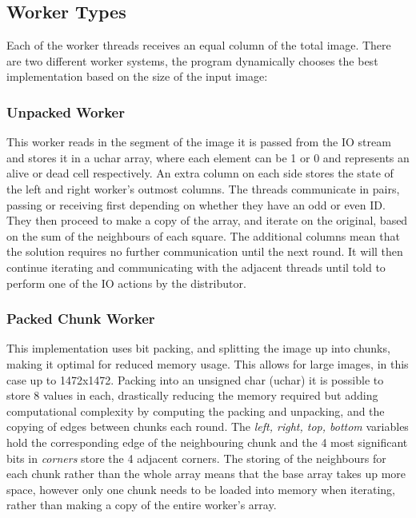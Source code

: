 \documentclass[11pt, oneside]{article}
\begin{document}
\subsection{Worker Types}
\vspace{-2mm}
Each of the worker threads receives an equal column of the total image. There are two different worker systems, the program dynamically chooses the best implementation based on the size of the input image:

\vspace{-4mm}
\subsubsection{Unpacked Worker}
\vspace{-3mm}

This worker reads in the segment of the image it is passed from the IO stream and stores it in a uchar array, where each element can be 1 or 0 and represents an alive or dead cell respectively. An extra column on each side stores the state of the left and right worker's outmost columns. The threads communicate in pairs, passing or receiving first depending on whether they have an odd or even ID. They then proceed to make a copy of the array, and iterate on the original, based on the sum of the neighbours of each square. The additional columns mean that the solution requires no further communication until the next round. It will then continue iterating and communicating with the adjacent threads until told to perform one of the IO actions by the distributor.

\vspace{-4mm}
\subsubsection{Packed Chunk Worker}
\vspace{-3mm}

This implementation uses bit packing, and splitting the image up into chunks, making it optimal for reduced memory usage. This allows for large images, in this case up to 1472x1472.
Packing into an unsigned char (uchar) it is possible to store 8 values in each, drastically reducing the memory required but adding computational complexity by computing the packing and unpacking, and the copying of edges between chunks each round. The \emph{left, right, top, bottom} variables hold the corresponding edge of the neighbouring chunk and the 4 most significant bits in \emph{corners} store the 4 adjacent corners. The storing of the neighbours for each chunk rather than the whole array means that the base array takes up more space, however only one chunk needs to be loaded into memory when iterating, rather than making a copy of the entire worker's array.
\end{document}
